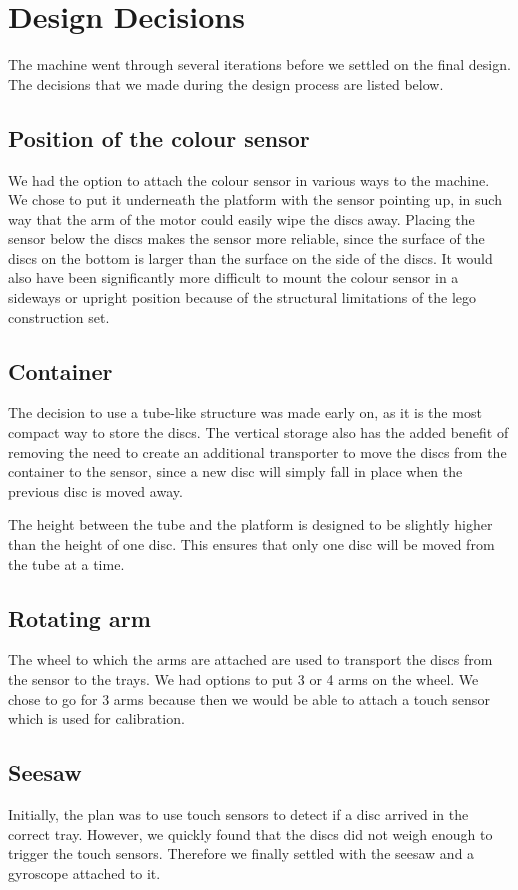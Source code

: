 \documentclass[a4paper,oneside,11pt]{article}
\begin{document}
\section{Design Decisions}
The machine went through several iterations before we settled on the final design. The decisions that we made during the design process are listed below.

\subsection{Position of the colour sensor}
We had the option to attach the colour sensor in various ways to the machine. We chose to put it underneath the platform with the sensor pointing up, in such way that the arm of the motor could easily wipe the discs away.  Placing the sensor below the discs makes the sensor more reliable, since the surface of the discs on the bottom is larger than the surface on the side of the discs. It would also have been significantly more difficult to mount the colour sensor in a sideways or upright position because of the structural limitations of the lego construction set.

\subsection{Container}
The decision to use a tube-like structure was made early on, as it is the most compact way to store the discs. The vertical storage also has the added benefit of removing the need to create an additional transporter to move the discs from the container to the sensor, since a new disc will simply fall in place when the previous disc is moved away.

The height between the tube and the platform is designed to be slightly higher than the height of one disc. This ensures that only one disc will be moved from the tube at a time.

\subsection{Rotating arm}
The wheel to which the arms are attached are used to transport the discs from the sensor to the trays. We had options to put 3 or 4 arms on the wheel. We chose to go for 3 arms because then we would be able to attach a touch sensor which is used for calibration.

\subsection{Seesaw}
Initially, the plan was to use touch sensors to detect if a disc arrived in the correct tray. However, we quickly found that the discs did not weigh enough to trigger the touch sensors. Therefore we finally settled with the seesaw and a gyroscope attached to it.
\end{document}
